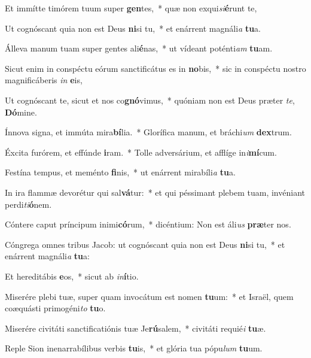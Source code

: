 \item Et immítte timórem tuum super \textbf{gen}tes,~* quæ non exqui\textit{si}\textbf{é}runt te,
\item Ut cognóscant quia non est Deus \textbf{ni}si tu,~* et enárrent magnáli\textit{a} \textbf{tu}a.
\item Álleva manum tuam super gentes ali\textbf{é}nas,~* ut vídeant poténti\textit{am} \textbf{tu}am.
\item Sicut enim in conspéctu eórum sanctificátus es in \textbf{no}bis,~* sic in conspéctu nostro magnificáberis \textit{in} \textbf{e}is,
\item Ut cognóscant te, sicut et nos co\textbf{gnó}vimus,~* quóniam non est Deus præter \textit{te}, \textbf{Dó}mine.
\item Ínnova signa, et immúta mira\textbf{bí}lia.~* Glorífica manum, et bráchi\textit{um} \textbf{dex}trum.
\item Éxcita furórem, et effúnde \textbf{i}ram.~* Tolle adversárium, et afflíge in\textit{i}\textbf{mí}cum.
\item Festína tempus, et meménto \textbf{fi}nis,~* ut enárrent mirabíli\textit{a} \textbf{tu}a.
\item In ira flammæ devorétur qui sal\textbf{vá}tur:~* et qui péssimant plebem tuam, invéniant perdi\textit{ti}\textbf{ó}nem.
\item Cóntere caput príncipum inimi\textbf{có}rum,~* dicéntium: Non est áli\textit{us} \textbf{præ}ter nos.
\item Cóngrega omnes tribus Jacob: ut cognóscant quia non est Deus \textbf{ni}si tu,~* et enárrent magnáli\textit{a} \textbf{tu}a:
\item Et hereditábis \textbf{e}os,~* sicut ab \textit{in}\textbf{í}tio.
\item Miserére plebi tuæ, super quam invocátum est nomen \textbf{tu}um:~* et Israël, quem coæquásti primogéni\textit{to} \textbf{tu}o.
\item Miserére civitáti sanctificatiónis tuæ Je\textbf{rú}salem,~* civitáti requié\textit{i} \textbf{tu}æ.
\item Reple Sion inenarrabílibus verbis \textbf{tu}is,~* et glória tua pópu\textit{lum} \textbf{tu}um.
